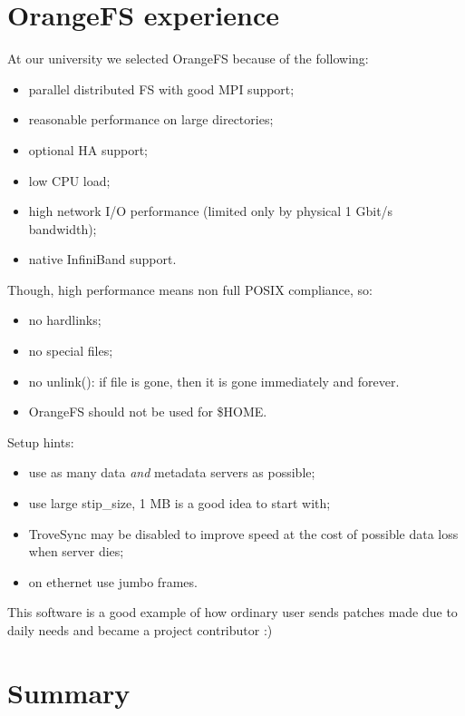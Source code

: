 \documentclass[10pt, a5paper]{article}
\begin{document}
\section*{OrangeFS experience}

At our university we selected OrangeFS because of the following:

\begin{itemize}
  \item parallel distributed FS with good MPI support;
  \item reasonable performance on large directories;
  \item optional HA support;
  \item low CPU load;
  \item high network I/O performance (limited only by physical 1 Gbit/s bandwidth);
  \item native InfiniBand\cite{bib15} support.
\end{itemize}

Though, high performance means non full POSIX compliance, so:

\begin{itemize}
  \item no hardlinks;
  \item no special files;
  \item no unlink(): if file is gone, then it is gone immediately and forever.
  \item OrangeFS should not be used for \$HOME.
\end{itemize}

Setup hints:

\begin{itemize}
  \item use as many data \emph{and} metadata servers as possible;
  \item use large stip\_size, 1 MB is a good idea to start with;
  \item TroveSync may be disabled to improve speed at the cost of possible data loss when server dies;
  \item on ethernet use jumbo frames.
\end{itemize}

This software is a good example of how ordinary user sends patches made due to daily needs and became a project contributor :)

\section*{Summary}
\end{document}
